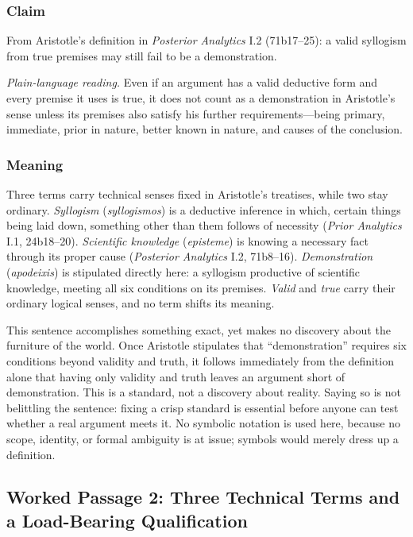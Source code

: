\subsubsection*{Claim}
From Aristotle's definition in \emph{Posterior Analytics} I.2 (71b17--25): a valid syllogism from true premises may still fail to be a demonstration.

\emph{Plain-language reading.} Even if an argument has a valid deductive form and every premise it uses is true, it does not count as a demonstration in Aristotle's sense unless its premises also satisfy his further requirements---being primary, immediate, prior in nature, better known in nature, and causes of the conclusion.

\subsubsection*{Meaning}
Three terms carry technical senses fixed in Aristotle's treatises, while two stay ordinary. \emph{Syllogism} (\emph{syllogismos}) is a deductive inference in which, certain things being laid down, something other than them follows of necessity (\emph{Prior Analytics} I.1, 24b18--20). \emph{Scientific knowledge} (\emph{episteme}) is knowing a necessary fact through its proper cause (\emph{Posterior Analytics} I.2, 71b8--16). \emph{Demonstration} (\emph{apodeixis}) is stipulated directly here: a syllogism productive of scientific knowledge, meeting all six conditions on its premises. \emph{Valid} and \emph{true} carry their ordinary logical senses, and no term shifts its meaning.

This sentence accomplishes something exact, yet makes no discovery about the furniture of the world. Once Aristotle stipulates that ``demonstration'' requires six conditions beyond validity and truth, it follows immediately from the definition alone that having only validity and truth leaves an argument short of demonstration. This is a standard, not a discovery about reality. Saying so is not belittling the sentence: fixing a crisp standard is essential before anyone can test whether a real argument meets it. No symbolic notation is used here, because no scope, identity, or formal ambiguity is at issue; symbols would merely dress up a definition.

\subsection{Worked Passage 2: Three Technical Terms and a Load-Bearing Qualification}

